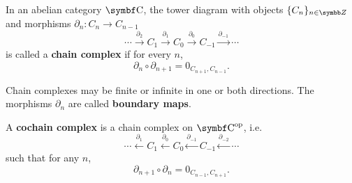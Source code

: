 \begin{definition}\label{def:chain_complex}\cite{nLab:chain_complex}
  In an abelian category \( \Bold{C} \), the tower diagram with objects \( \{ C_n \}_{n \in \BB{Z}} \) and morphisms \( \partial_n: C_n \to C_{n-1} \)
  \begin{equation}\label{def:chain_complex/chain_diagram}
    \cdots
    \overset {\partial_2} \longrightarrow
    C_1
    \overset {\partial_1} \longrightarrow
    C_0
    \overset {\partial_0} \longrightarrow
    C_{-1}
    \overset {\partial_{-1}} \longrightarrow
    \cdots
  \end{equation}
  is called a \textbf{chain complex} if for every \( n \),
  \begin{equation*}
    \partial_n \circ \partial_{n+1} = 0_{C_{n+1},C_{n-1}}.
  \end{equation*}

  Chain complexes may be finite or infinite in one or both directions. The morphisms \( \partial_n \) are called \textbf{boundary maps}.

  A \textbf{cochain complex} is a chain complex on \( \Bold{C}^{\Op} \), i.e.
  \begin{equation}\label{def:chain_complex/cochain_diagram}
    \cdots
    \overset {\partial_1} \longleftarrow
    C_1
    \overset {\partial_0} \longleftarrow
    C_0
    \overset {\partial_{-1}} \longleftarrow
    C_{-1}
    \overset {\partial_{-2}} \longleftarrow
    \cdots
  \end{equation}
  such that for any \( n \),
  \begin{equation*}
    \partial_{n+1} \circ \partial_n = 0_{C_{n-1},C_{n+1}}.
  \end{equation*}
\end{definition}
